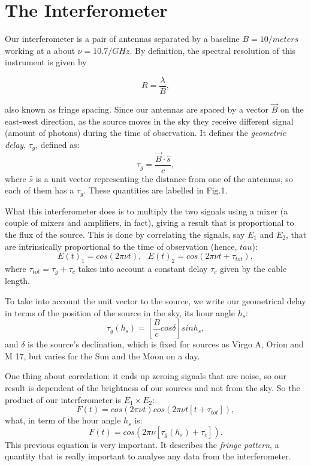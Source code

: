 \documentclass{article}
\begin{document}
\section{The Interferometer}

Our interferometer is a pair of antennas separated by a baseline $B = 10
/meters$ working at a about $\nu = 10.7 / GHz$. By definition, the spectral
resolution of this instrument is given by

\begin{equation}
R = \frac{\lambda}{B},
\label{eq:spec_res}
\end{equation} 

also known as fringe spacing. Since our antennas are spaced by a vector $\vec{B}$ on
the east-west direction, as the source moves in the sky they receive
different signal (amount of photons) during the time of
observation. It defines the \emph{geometric delay}, $\tau_{g}$, defined as:
\begin{equation}
\tau_{g} = \frac{\vec{B} \cdot \hat{s}}{c},
\label{eq:tau}
\end{equation}  
where $\hat{s}$ is a unit vector representing the distance from one of
the antennas, so each of them has a $\tau_{g}$. These quantities are
labelled in Fig.1. 

What this interferometer does is to multiply the two
signals using a mixer (a couple of mixers and amplifiers, in fact),
giving a result that is proportional to the flux of the source. This is
done by correlating the signals, say $E_{1}$ and $E_{2}$, that are
intrinsically proportional to the time of observation (hence, $tau$):
\begin{equation}
E(t)_{1} = cos(2 \pi \nu t), \text{ } E(t)_{2} = cos(2 \pi \nu t + \tau_{tot}),
\label{eq:ampl}
\end{equation} 
where $\tau_{tot} = \tau_{g} + \tau_{c}$ takes into account a constant delay
$\tau_{c}$ given by the cable length.

To take into account the unit vector to the source, we write our
geometrical delay in terms of the position of the source in the sky, its
hour angle $h_{s}$:
\begin{equation}
\tau_{g}(h_{s})=\left[\frac{B}{c}cos\delta \right]sinh_{s},
\label{eq:tau_ha}
\end{equation} 
and $\delta$ is the source's declination, which is fixed for sources as
Virgo A, Orion and M 17, but varies for the Sun and the Moon on a day. 

One thing about correlation: it ends up zeroing signals that are noise,
so our result is dependent of the brightness of our sources and not from
the sky. So the product of our interferometer is $E_{1} \times E_{2}$:
\begin{equation}
F(t) = cos(2 \pi \nu t)cos(2 \pi \nu t[t+ \tau_{tot}]),
\label{eq:imp}
\end{equation} 
what, in term of the hour angle $h_{s}$ is:
\begin{equation}
F(t) = cos(2 \pi \nu[\tau_{g}(h_{s}) + \tau_{c}]).
\label{eq:very_imp}
\end{equation} 
This previous equation is very important. It describes the \emph{fringe
  pattern}, a quantity that is really important to analyse any data from
the interferometer. 
\end{document}
